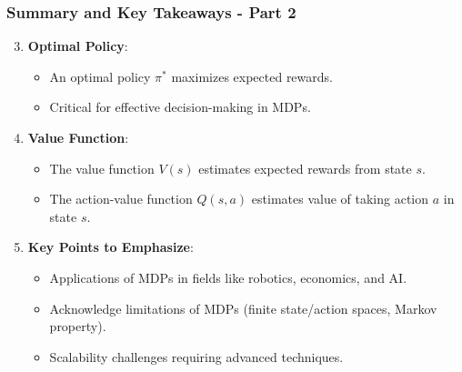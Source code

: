 \documentclass[aspectratio=169]{beamer}
\begin{document}
\begin{frame}[fragile]
    \frametitle{Summary and Key Takeaways - Part 2}
    \begin{enumerate}
        \setcounter{enumi}{2}
        \item \textbf{Optimal Policy}:
        \begin{itemize}
            \item An optimal policy \(\pi^*\) maximizes expected rewards.
            \item Critical for effective decision-making in MDPs.
        \end{itemize}

        \item \textbf{Value Function}:
        \begin{itemize}
            \item The value function \(V(s)\) estimates expected rewards from state \(s\).
            \item The action-value function \(Q(s, a)\) estimates value of taking action \(a\) in state \(s\).
        \end{itemize}
        
        \item \textbf{Key Points to Emphasize}:
        \begin{itemize}
            \item Applications of MDPs in fields like robotics, economics, and AI.
            \item Acknowledge limitations of MDPs (finite state/action spaces, Markov property).
            \item Scalability challenges requiring advanced techniques.
        \end{itemize}
    \end{enumerate}
\end{frame}
\end{document}
